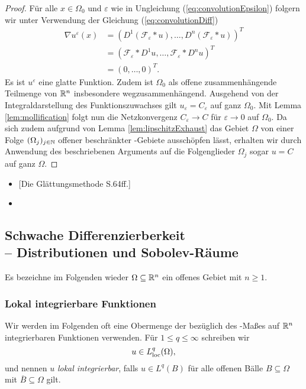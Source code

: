 \begin{proof}
  Für alle $x \in \Omega_0$ und $\varepsilon$ wie in Ungleichung (\ref{eq:convolutionEpsilon}) folgern wir unter Verwendung der Gleichung (\ref{eq:convolutionDiff})
  \begin{align*}
    \nabla u^\varepsilon(x)
    &= (D^1 (\mathcal{F}_\varepsilon \ast u), \dots, D^n (\mathcal{F}_\varepsilon \ast u))^T \\
    &= ( \mathcal{F}_\varepsilon \ast D^1 u, \dots, \mathcal{F}_\varepsilon \ast D^n u)^T \\
    &= (0, \dots, 0)^T.
  \end{align*}
  Es ist $u^\varepsilon$ eine glatte Funktion.
  Zudem ist $\Omega_0$ als offene zusammenhängende Teilmenge von $\mathbb{R}^n$ insbesondere wegzusammenhängend.
  Ausgehend von der Integraldarstellung des Funktionszuwachses \cite[S.57]{koenigsberger2004ana2} gilt $u_\varepsilon = C_\varepsilon$ auf ganz $\Omega_0$.
  Mit Lemma \ref{lem:mollification} folgt nun die Netzkonvergenz $C_\varepsilon \to C$ für $\varepsilon \to 0$ auf $\Omega_0$.
  Da sich zudem aufgrund von Lemma \ref{lem:lipschitzExhaust} das Gebiet $\Omega$ von einer Folge $(\Omega_j)_{j \in \mathbb{N}}$ offener beschränkter \lipschitz\hyp{}Gebiete ausschöpfen lässt, erhalten wir durch Anwendung des beschriebenen Arguments auf die Folgenglieder $\Omega_j$ sogar $u = C$ auf ganz $\Omega$.
\end{proof}

\begin{itemize}
  \item \cite{sohr2001navier}[Die Glättungsmethode S.64ff.]
  \item \cite[S.10, S.9(alt), S.36, S.30(alt)]{adams2003sobolev}
\end{itemize}

\subsection{Schwache Differenzierberkeit \\-- Distributionen und Sobolev-Räume}
\label{subsec:distributionsSobolev}

Es bezeichne im Folgenden wieder $\Omega \subseteq \mathbb{R}^n$ ein offenes Gebiet mit $n \geq 1$.

\subsubsection{Lokal integrierbare Funktionen}

Wir werden im Folgenden oft eine Obermenge der bezüglich des \lebesgue\hyp{}Maßes auf $\mathbb{R}^n$ integrierbaren Funktionen verwenden.
Für $1 \leq q \leq \infty$ schreiben wir
$$
  u \in L^q_{\operatorname{loc}}(\Omega),
$$
und nennen $u$ \emph{lokal integrierbar}, falls $u \in L^q(B)$ für alle offenen Bälle $B \subseteq \Omega$ mit $\overline B \subseteq \Omega$ gilt.

